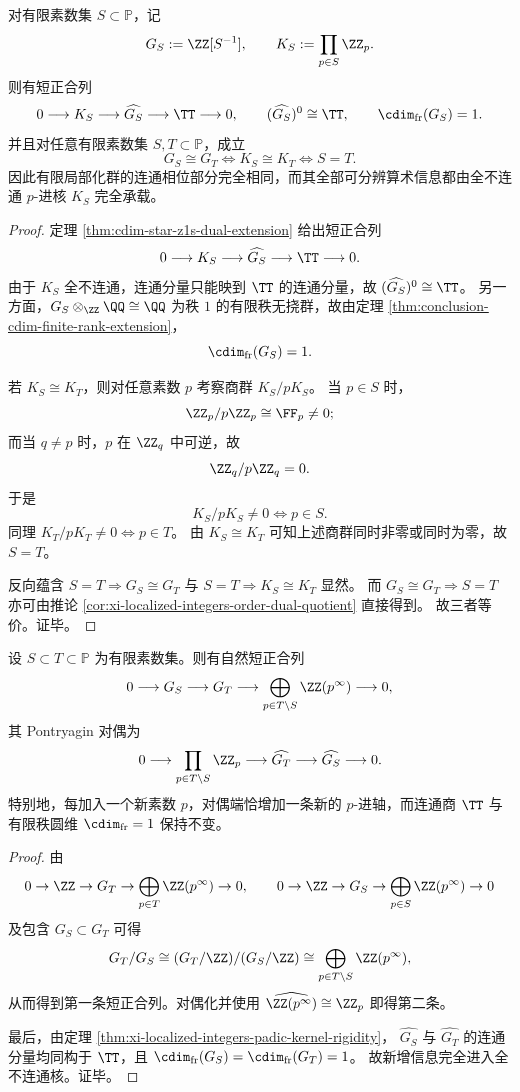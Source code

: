 \begin{theorem}\label{thm:xi-localized-integers-padic-kernel-rigidity}
对有限素数集 \(S\subset\mathbb P\)，记
\[
G_S:=\ZZ[S^{-1}],
\qquad
K_S:=\prod_{p\in S}\ZZ_p.
\]
则有短正合列
\[
0\longrightarrow K_S\longrightarrow \widehat{G_S}\longrightarrow \TT\longrightarrow 0,
\qquad
(\widehat{G_S})^0\cong \TT,
\qquad
\cdim_{\mathrm{fr}}(G_S)=1.
\]
并且对任意有限素数集 \(S,T\subset\mathbb P\)，成立
\[
G_S\cong G_T
\iff
K_S\cong K_T
\iff
S=T.
\]
因此有限局部化群的连通相位部分完全相同，而其全部可分辨算术信息都由全不连通
\(p\)-进核 \(K_S\) 完全承载。
\end{theorem}
\begin{proof}
定理 \ref{thm:cdim-star-z1s-dual-extension} 给出短正合列
\[
0\longrightarrow K_S\longrightarrow \widehat{G_S}\longrightarrow \TT\longrightarrow 0.
\]
由于 \(K_S\) 全不连通，连通分量只能映到 \(\TT\) 的连通分量，故
\(
(\widehat{G_S})^0\cong \TT
\)。
另一方面，\(G_S\otimes_{\ZZ}\QQ\cong \QQ\) 为秩 \(1\) 的有限秩无挠群，故由定理
\ref{thm:conclusion-cdim-finite-rank-extension}，
\[
\cdim_{\mathrm{fr}}(G_S)=1.
\]

若 \(K_S\cong K_T\)，则对任意素数 \(p\) 考察商群 \(K_S/pK_S\)。
当 \(p\in S\) 时，
\[
\ZZ_p/p\ZZ_p\cong \FF_p\neq 0;
\]
而当 \(q\neq p\) 时，\(p\) 在 \(\ZZ_q\) 中可逆，故
\[
\ZZ_q/p\ZZ_q=0.
\]
于是
\[
K_S/pK_S\neq 0
\iff
p\in S.
\]
同理
\(
K_T/pK_T\neq 0\iff p\in T
\)。
由 \(K_S\cong K_T\) 可知上述商群同时非零或同时为零，故 \(S=T\)。

反向蕴含 \(S=T\Rightarrow G_S\cong G_T\) 与 \(S=T\Rightarrow K_S\cong K_T\) 显然。
而 \(G_S\cong G_T\Rightarrow S=T\) 亦可由推论
\ref{cor:xi-localized-integers-order-dual-quotient} 直接得到。
故三者等价。证毕。
\end{proof}

\begin{corollary}[有限局部化塔的逐素数增量律]\label{cor:xi-localized-integers-prime-axis-increment-law}
设 \(S\subset T\subset\mathbb P\) 为有限素数集。则有自然短正合列
\[
0\longrightarrow G_S\longrightarrow G_T\longrightarrow
\bigoplus_{p\in T\setminus S}\ZZ(p^\infty)\longrightarrow 0,
\]
其 Pontryagin 对偶为
\[
0\longrightarrow \prod_{p\in T\setminus S}\ZZ_p
\longrightarrow \widehat{G_T}
\longrightarrow \widehat{G_S}
\longrightarrow 0.
\]
特别地，每加入一个新素数 \(p\)，对偶端恰增加一条新的 \(p\)-进轴，而连通商
\(\TT\) 与有限秩圆维 \(\cdim_{\mathrm{fr}}=1\) 保持不变。
\end{corollary}
\begin{proof}
由
\[
0\to \ZZ\to G_T\to \bigoplus_{p\in T}\ZZ(p^\infty)\to 0,
\qquad
0\to \ZZ\to G_S\to \bigoplus_{p\in S}\ZZ(p^\infty)\to 0
\]
及包含 \(G_S\subset G_T\) 可得
\[
G_T/G_S
\cong
(G_T/\ZZ)/(G_S/\ZZ)
\cong
\bigoplus_{p\in T\setminus S}\ZZ(p^\infty),
\]
从而得到第一条短正合列。对偶化并使用
\(
\widehat{\ZZ(p^\infty)}\cong \ZZ_p
\)
即得第二条。

最后，由定理 \ref{thm:xi-localized-integers-padic-kernel-rigidity}，
\(\widehat{G_S}\) 与 \(\widehat{G_T}\) 的连通分量均同构于 \(\TT\)，且
\(\cdim_{\mathrm{fr}}(G_S)=\cdim_{\mathrm{fr}}(G_T)=1\)。
故新增信息完全进入全不连通核。证毕。
\end{proof}

